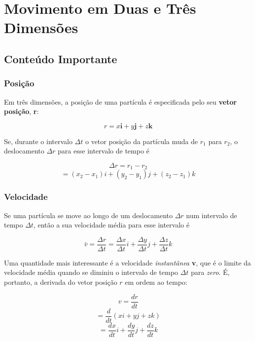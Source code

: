 \section{Movimento em Duas e Três Dimensões}
\subsection{Conteúdo Importante}
\subsubsection{Posição}

Em três dimensões, a posição de uma partícula é especificada pelo seu \textbf{vetor posição}, \textbf{r}:

\begin{equation}
    r=x\mathbf{i}+y\mathbf{j}+z\mathbf{k}
\end{equation}

Se, durante o intervalo $\Delta t$ o vetor posição da partícula muda de $r_1$ para $r_2$, o deslocamento $\Delta r$ para esse intervalo de tempo é

\begin{equation}
    \Delta r=r_1-r_2
\end{equation}
\begin{equation}
    =(x_2-x_1)i+(y_2-y_1)j+(z_2-z_1)k
\end{equation}

\subsubsection{Velocidade}

Se uma partícula se move ao longo de um deslocamento $\Delta r$ num intervalo de tempo $\Delta t$, então a sua velocidade média para esse intervalo é

\begin{equation}
    \bar{v}=\frac{\Delta r}{\Delta t}=\frac{\Delta x}{\Delta t}i+\frac{\Delta y}{\Delta t}j+\frac{\Delta z}{\Delta t}k
\end{equation}

Uma quantidade mais interessante é a velocidade \emph{instantânea} \textbf{v}, que é o limite da velocidade média quando se diminiu o intervalo de tempo $\Delta t$ para \emph{zero}. É, portanto, a derivada do vetor posição $r$ em ordem ao tempo:

\begin{equation}
    v=\frac{dr}{dt}
\end{equation}
\begin{equation}
    =\frac{d}{dt}(xi+yj+zk)
\end{equation}
\begin{equation}
    =\frac{dx}{dt}i+\frac{dy}{dt}j+\frac{dz}{dt}k
\end{equation}

